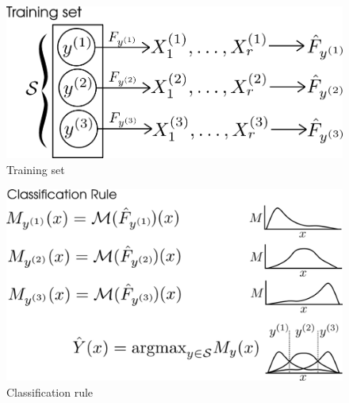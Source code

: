 \documentclass[12pt]{article}
\begin{document}


\begin{figure}[h]
\centering
\includegraphics[scale = 0.4]{extrapolation_figures/training_set.png}
\caption{Training set}\label{fig:training_set}
\end{figure}

\begin{figure}[h]
\centering
\includegraphics[scale = 0.4]{extrapolation_figures/classification_rule.png}
\caption{Classification rule}\label{fig:classification_rule}
\end{figure}
\end{document}
